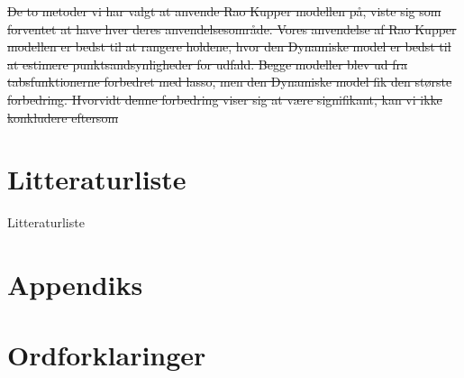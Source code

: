 \documentclass[11pt,a4paper]{article}
\begin{document}
\sout{De to metoder vi har valgt at anvende Rao Kupper modellen på, viste sig som forventet at have hver deres anvendelsesområde. Vores anvendelse af Rao Kupper modellen er bedst til at rangere holdene, hvor den Dynamiske model er bedst til at estimere punktsandsynligheder for udfald. Begge modeller blev ud fra tabsfunktionerne forbedret med lasso, men den Dynamiske model fik den største forbedring. Hvorvidt denne forbedring viser sig at være signifikant, kan vi ikke konkludere eftersom }
\clearpage
\section{Litteraturliste}
Litteraturliste
\clearpage
\section{Appendiks}

\clearpage
\printbibliography %
\section{Ordforklaringer}
\end{document}
